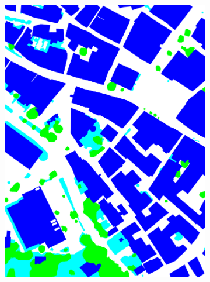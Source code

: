\begin{figure}[htb]
\begin{subfigure}{0.19\textwidth}
  \includegraphics[width=1\linewidth]{fig/vai/5_gt.png}
\end{subfigure}



\end{figure}
